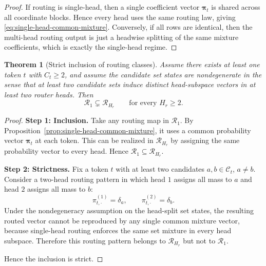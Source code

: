 \documentclass{article}
\theoremstyle{plain}
\newtheorem{theorem}{Theorem}[section]
\theoremstyle{definition}
\theoremstyle{remark}
\begin{document}
\begin{proof}
If routing is single-head, then a single coefficient vector $\boldsymbol{\pi}_{t}$ is shared across all coordinate blocks. Hence every head uses the same routing law, giving \eqref{eq:single-head-common-mixture}. Conversely, if all rows are identical, then the multi-head routing output is just a headwise splitting of the same mixture coefficients, which is exactly the single-head regime.
\end{proof}

\begin{theorem}[Strict inclusion of routing classes]
\label{thm:strict-routing-inclusion}
Assume there exists at least one token $t$ with $C_{t}\ge 2$, and assume the candidate set states are nondegenerate in the sense that at least two candidate sets induce distinct head-subspace vectors in at least two router heads. Then
\begin{equation}
\label{eq:strict-routing-inclusion}
\mathcal{R}_1 \subsetneq \mathcal{R}_{H_r}
\qquad \text{for every } H_r\ge 2.
\end{equation}
\end{theorem}

\begin{proof}
\textbf{Step 1: Inclusion.}
Take any routing map in $\mathcal{R}_1$. By Proposition~\ref{prop:single-head-common-mixture}, it uses a common probability vector $\boldsymbol{\pi}_{t}$ at each token. This can be realized in $\mathcal{R}_{H_r}$ by assigning the same probability vector to every head. Hence $\mathcal{R}_1 \subseteq \mathcal{R}_{H_r}$.

\textbf{Step 2: Strictness.}
Fix a token $t$ with at least two candidates $a,b\in \mathcal{C}_{t}$, $a\neq b$. Consider a two-head routing pattern in which head $1$ assigns all mass to $a$ and head $2$ assigns all mass to $b$:
\[
\pi^{(1)}_{t,\cdot} = \delta_a,
\qquad
\pi^{(2)}_{t,\cdot} = \delta_b.
\]
Under the nondegeneracy assumption on the head-split set states, the resulting routed vector cannot be reproduced by any single common mixture vector, because single-head routing enforces the same set mixture in every head subspace. Therefore this routing pattern belongs to $\mathcal{R}_{H_r}$ but not to $\mathcal{R}_1$.

Hence the inclusion is strict.
\end{proof}
\end{document}
